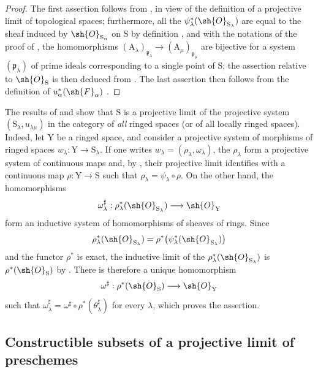 \begin{proof}
The first assertion follows from , in view of the definition of a projective limit of topological spaces; furthermore, all the $\psi_\lambda^*(\sh{O}_{\mathrm{S}_\lambda})$ are equal to the sheaf induced by $\sh{O}_{\mathrm{S}_\alpha}$ on $\mathrm{S}$ by definition , and with the notations of the proof of , the homomorphisms $(\mathrm{A}_\lambda)_{\mathfrak{p}_\lambda}\to(\mathrm{A}_\mu)_{\mathfrak{p}_\mu}$ are bijective for a system $(\mathfrak{p}_\lambda)$ of prime ideals corresponding to a single point of $\mathrm{S}$; the assertion relative to $\sh{O}_\mathrm{S}$ is then deduced from .
The last assertion then follows from the definition of $u_\alpha^*(\sh{F}_\alpha)$ .
\end{proof}

\begin{remark}[8.2.14]
\label{IV.8.2.14}
The results of  and  show that $\mathrm{S}$ is a projective limit of the projective system $(\mathrm{S}_\lambda,u_{\lambda\mu})$ in the category of \emph{all} ringed spaces (or of all locally ringed spaces).
Indeed, let $\mathrm{Y}$ be a ringed space, and consider a projective system of morphisms of ringed spaces $w_\lambda:\mathrm{Y}\to\mathrm{S}_\lambda$.
If one writes $w_\lambda=(\rho_\lambda,\omega_\lambda)$, the $\rho_\lambda$ form a projective system of continuous maps and, by , their projective limit identifies with a continuous map $\rho:\mathrm{Y}\to\mathrm{S}$ such that $\rho_\lambda=\psi_\lambda\circ\rho$. On the other hand, the homomorphisms
\[
 \omega_\lambda^\sharp:\rho_\lambda^*(\sh{O}_{\mathrm{S}_\lambda})\longrightarrow\sh{O}_\mathrm{Y}
\]
form an inductive system of homomorphisms of sheaves of rings. Since
\[
 \rho_\lambda^*(\sh{O}_{\mathrm{S}_\lambda})
 =\rho^*\bigl(\psi_\lambda^*(\sh{O}_{\mathrm{S}_\lambda})\bigr)
\]
and the functor $\rho^*$ is exact, the inductive limit of the $\rho_\lambda^*(\sh{O}_{\mathrm{S}_\lambda})$ is $\rho^*(\sh{O}_\mathrm{S})$ by . There is therefore a unique homomorphism
\[
 \omega^\sharp:\rho^*(\sh{O}_\mathrm{S})\longrightarrow\sh{O}_\mathrm{Y}
\]
such that $\omega_\lambda^\sharp=\omega^\sharp\circ\rho^*(\theta_\lambda^\sharp)$ for every $\lambda$, which proves the assertion.
\end{remark}

\subsection{Constructible subsets of a projective limit of preschemes}
\label{subsection:IV.8.3}

